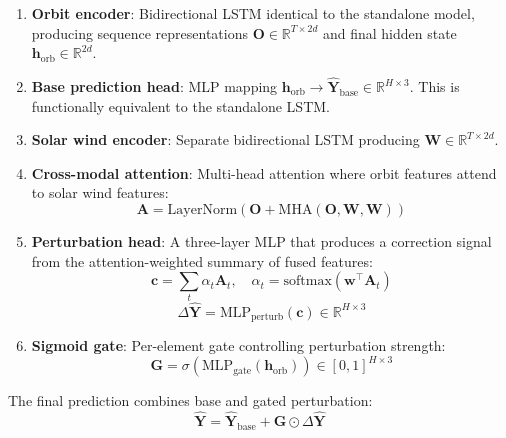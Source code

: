 \documentclass[twocolumn]{article}
\begin{document}
\begin{enumerate}
  \item \textbf{Orbit encoder}: Bidirectional LSTM identical to the
    standalone model, producing sequence representations
    $\mathbf{O} \in \mathbb{R}^{T \times 2d}$ and final hidden state
    $\mathbf{h}_{\text{orb}} \in \mathbb{R}^{2d}$.

  \item \textbf{Base prediction head}: MLP mapping
    $\mathbf{h}_{\text{orb}} \rightarrow \hat{\mathbf{Y}}_{\text{base}} \in \mathbb{R}^{H \times 3}$.
    This is functionally equivalent to the standalone LSTM.

  \item \textbf{Solar wind encoder}: Separate bidirectional LSTM
    producing $\mathbf{W} \in \mathbb{R}^{T \times 2d}$.

  \item \textbf{Cross-modal attention}: Multi-head attention where orbit
    features attend to solar wind features:
    \begin{equation}
      \mathbf{A} = \text{LayerNorm}(\mathbf{O} + \text{MHA}(\mathbf{O}, \mathbf{W}, \mathbf{W}))
    \end{equation}

  \item \textbf{Perturbation head}: A three-layer MLP that produces a
    correction signal from the attention-weighted summary of fused features:
    \begin{equation}
      \mathbf{c} = \sum_t \alpha_t \mathbf{A}_t, \quad
      \alpha_t = \text{softmax}(\mathbf{w}^\top \mathbf{A}_t)
    \end{equation}
    \begin{equation}
      \Delta\hat{\mathbf{Y}} = \text{MLP}_{\text{perturb}}(\mathbf{c}) \in \mathbb{R}^{H \times 3}
    \end{equation}

  \item \textbf{Sigmoid gate}: Per-element gate controlling perturbation
    strength:
    \begin{equation}
      \mathbf{G} = \sigma(\text{MLP}_{\text{gate}}(\mathbf{h}_{\text{orb}})) \in [0, 1]^{H \times 3}
    \end{equation}
\end{enumerate}

The final prediction combines base and gated perturbation:
\begin{equation}
  \hat{\mathbf{Y}} = \hat{\mathbf{Y}}_{\text{base}} + \mathbf{G} \odot \Delta\hat{\mathbf{Y}}
  \label{eq:residual}
\end{equation}
\end{document}
